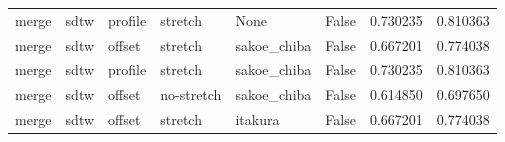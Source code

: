 \begin{tabular}{llllllrr}
  merge &     sdtw &  profile &    stretch &        None &     False &    0.730235 &     0.810363 \\
  merge &     sdtw &   offset &    stretch & sakoe\_chiba &     False &    0.667201 &     0.774038 \\
  merge &     sdtw &  profile &    stretch & sakoe\_chiba &     False &    0.730235 &     0.810363 \\
  merge &     sdtw &   offset & no-stretch & sakoe\_chiba &     False &    0.614850 &     0.697650 \\
  merge &     sdtw &   offset &    stretch &     itakura &     False &    0.667201 &     0.774038 \\
\bottomrule
\end{tabular}
